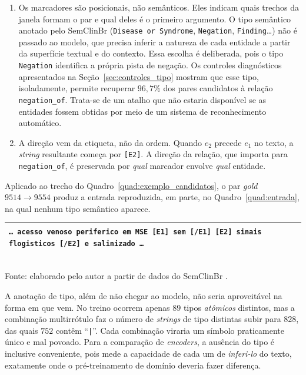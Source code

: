 \begin{enumerate}
  \item Os marcadores são posicionais, não semânticos. Eles indicam
        quais trechos da janela formam o par e qual deles é o primeiro
        argumento. O tipo semântico anotado pelo SemClinBr
        (\texttt{Disease or Syndrome}, \texttt{Negation}, \texttt{Finding}\ldots)
        não é passado ao modelo, que precisa inferir a natureza de cada
        entidade a partir da superfície textual e do contexto. Essa escolha é deliberada, pois o tipo \texttt{Negation} identifica a própria pista de negação. Os controles diagnósticos apresentados na Seção~\ref{sec:controles_tipo} mostram que esse tipo, isoladamente, permite recuperar $96{,}7\%$ dos pares candidatos à relação \texttt{negation\_of}. Trata-se de um atalho que não estaria disponível se as entidades fossem obtidas por meio de um sistema de reconhecimento automático.
  \item A direção vem da etiqueta, não da ordem. Quando $e_2$ precede
        $e_1$ no texto, a \emph{string} resultante começa por \texttt{[E2]}. A
        direção da relação, que importa para \texttt{negation\_of}, é preservada por
        \emph{qual} marcador envolve \emph{qual} entidade.
\end{enumerate}

Aplicado ao trecho do Quadro~\ref{quad:exemplo_candidatos}, o par \emph{gold}
$9514 \rightarrow 9554$ produz a entrada reproduzida, em parte, no
Quadro~\ref{quad:entrada}, na qual nenhum tipo semântico aparece.

\begin{quadro}[htbp]
  \centering
  \caption{Entrada efetivamente construída para o par \emph{gold} do Quadro~\ref{quad:exemplo_candidatos}.}
  \label{quad:entrada}
  \begin{tabular}{p{}}
  \toprule
  \texttt{\ldots{} acesso venoso periferico em MSE [E1] sem [/E1] [E2] sinais
  flogisticos [/E2] e salinizado \ldots} \\
  \bottomrule
  \end{tabular}\\[4pt]
  {\footnotesize Fonte: elaborado pelo autor a partir de dados do SemClinBr \cite{oliveira_2022_semclinbr}.}
\end{quadro}

A anotação de tipo, além de não chegar ao modelo, não seria aproveitável na forma em que vem. No treino ocorrem apenas $89$ tipos
\emph{atômicos} distintos, mas a combinação multirrótulo faz o número de
\emph{strings} de tipo distintas subir para $828$, das quais $752$ contêm
``\texttt{|}''. Cada combinação viraria um símbolo praticamente único e mal povoado.
Para a comparação de \emph{encoders}, a ausência do tipo é inclusive conveniente,
pois mede a capacidade de cada um de \emph{inferi-lo} do texto, exatamente onde o
pré-treinamento de domínio deveria fazer diferença.
\label{sec:markers_limitacao}

